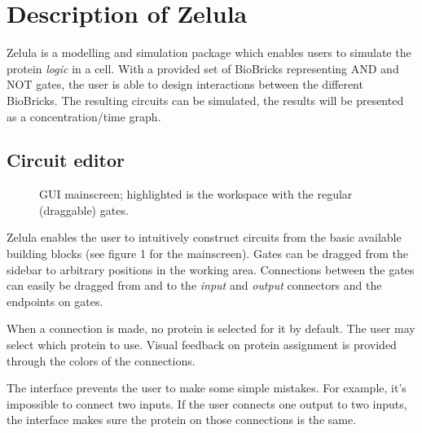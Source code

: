 

\newcommand{\screenshotScale}{1.4}



\section{Description of Zelula}
Zelula is a modelling and simulation package which enables users to simulate the protein \textit{logic} in a cell. With a provided set of BioBricks representing AND and NOT gates, the user is able to design interactions between the different BioBricks. The resulting circuits can be simulated, the results will be presented as a concentration/time graph.


\subsection{Circuit editor}
\begin{figure}[h!]
\centering{}
\caption{GUI mainscreen; highlighted is the workspace with the regular (draggable) gates.}
\end{figure}

\noindent Zelula enables the user to intuitively construct circuits from the basic available building blocks (see figure 1 for the mainscreen). Gates can be dragged from the sidebar to arbitrary positions in the working area. Connections between the gates can easily be dragged from and to the \textit{input} and \textit{output} connectors and the endpoints on gates. 

When a connection is made, no protein is selected for it by default. The user may select which protein to use. Visual feedback on protein assignment is provided through the colors of the connections.

The interface prevents the user to make some simple mistakes. For example, it's impossible to connect two inputs. If the user connects one output to two inputs, the interface makes sure the protein on those connections is the same.

